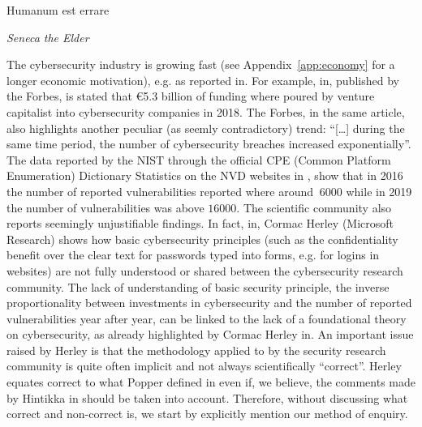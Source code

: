 \epigraph{Humanum est errare}{{\itshape Seneca the Elder}}
The cybersecurity industry is growing fast (see Appendix~\ref{app:economy} for
a longer economic motivation), e.g. as reported in\autocite{Nasdaq2018market}.
For example, in\autocite{Forbes2017market}, published by the Forbes, is stated
that \euro5.3 billion of funding where poured by venture capitalist into
cybersecurity companies in 2018. The Forbes, in the same article, also
highlights another peculiar (as seemly contradictory) trend: ``[\ldots] during
the same time period, the number of cybersecurity breaches increased
exponentially''. The data reported by the NIST through the official CPE (Common
Platform Enumeration) Dictionary Statistics on the NVD websites in
\autocite{NIST2020CPEstatistics}, show that in 2016 the number of reported
vulnerabilities reported where around $~6000$ while in 2019 the number of
vulnerabilities was above $16000$.  The scientific community also reports
seemingly unjustifiable findings.  In fact, in\autocite{Herley2009so}, Cormac
Herley (Microsoft Research) shows how basic cybersecurity principles (such as
the confidentiality benefit over the clear text for passwords typed into forms,
e.g. for logins in websites) are not fully understood or shared between the
cybersecurity research community\autocite{Nielsen2009stop}.  The lack of
understanding of basic security principle, the inverse proportionality between
investments in cybersecurity and the number of reported vulnerabilities year
after year, can be linked to the lack of a foundational theory on
cybersecurity, as already highlighted by Cormac Herley
in\autocite{Herley2016unfalsifiability}.  An important issue raised by Herley
is that the methodology applied to by the security research community is quite
often implicit and not always scientifically ``correct''. Herley equates
correct to what Popper defined in \autocite{popper1962conjectures} even if, we
believe, the comments made by Hintikka in \autocite{Hintikka1993Information}
should be taken into account. Therefore, without discussing what correct and
non-correct is, we start by explicitly mention our method of enquiry. 

